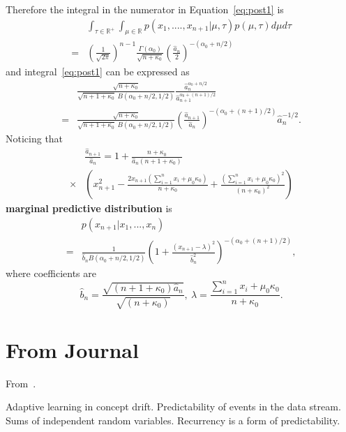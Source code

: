 Therefore the integral in the numerator in Equation~\ref{eq:post1} is
\begin{align}
    &\int_{\tau\in \mathbb{R}^+} \int_{\mu\in \mathbb{R}}p(x_1,....,x_{n+1}|\mu,\tau) p(\mu,\tau)d\mu d\tau\\\nonumber
    =& \left(\frac{1}{\sqrt{2\pi}}\right)^{n-1} \frac{\Gamma(\alpha_0)}{\sqrt{n+\kappa_0}} \left(\frac{\hat{a}_n}2\right)^{-(\alpha_0+n/2)}
\end{align}
and integral~\ref{eq:post1} can be expressed as
\begin{align}
    &\frac{\sqrt{n+\kappa_0}}{\sqrt{n+1+\kappa_0}\ B(\alpha_0+n/2,1/2)} \frac{\hat{a}_n^{\alpha_0+n/2}}{\hat{a}_{n+1}^{\alpha_0+(n+1)/2}}\\\nonumber
    =&\frac{\sqrt{n+\kappa_0}}{\sqrt{n+1+\kappa_0}\ B(\alpha_0+n/2,1/2)} \left(\frac{\hat{a}_{n+1}}{\hat{a}_n}\right)^{-(\alpha_0+(n+1)/2)} \hat{a}_n^{-1/2}.
\end{align}
Noticing that
\begin{align}
    &\frac{\hat{a}_{n+1}}{\hat{a}_n} = 1+ \frac{n+\kappa_0}{\hat{a}_n(n+1+\kappa_0)}\\\nonumber \times &\left(x_{n+1}^2 - \frac{2x_{n+1}\left(\sum_{i=1}^n x_i +\mu_0 \kappa_0\right)}{n+\kappa_0}
    + \frac{\left(\sum_{i=1}^n x_i +\mu_0 \kappa_0\right)^2}{(n+\kappa_0)^2}\right)
\end{align}
\textbf{marginal predictive distribution} is 
\begin{align}
    &p(x_{n+1}|x_1,...,x_n)\\\nonumber =& \frac{1}{\hat{b}_n B(\alpha_0+n/2,1/2)} \left(
1+\frac{(x_{n+1}-\lambda)^2}{\hat{b}_n^2}\right)^{-(\alpha_0+(n+1)/2)},
\end{align}
where coefficients are
\begin{equation}
    \hat{b}_n = \frac{\sqrt{(n+1+\kappa_0)\hat{a}_n}}{\sqrt{(n+\kappa_0)}},\ \lambda = \frac{\sum_{i=1}^n x_i +\mu_0 \kappa_0}{n+\kappa_0}.
\end{equation}


\section{From Journal}
From~\cite{Maslov2021}.

Adaptive learning in concept drift.
Predictability of events in the data stream.
Sums of independent random variables.
Recurrency is a form of predictability.

